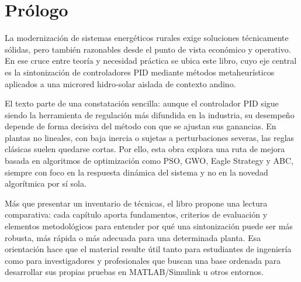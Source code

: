 \chapter*{Prólogo}

La modernización de sistemas energéticos rurales exige soluciones técnicamente sólidas,
pero también razonables desde el punto de vista económico y operativo. En ese cruce
entre teoría y necesidad práctica se ubica este libro, cuyo eje central es la sintonización
de controladores PID mediante métodos metaheurísticos aplicados a una microred
hidro-solar aislada de contexto andino.

El texto parte de una constatación sencilla: aunque el controlador PID sigue siendo la
herramienta de regulación más difundida en la industria, su desempeño depende de forma
decisiva del método con que se ajustan sus ganancias. En plantas no lineales, con baja
inercia o sujetas a perturbaciones severas, las reglas clásicas suelen quedarse cortas.
Por ello, esta obra explora una ruta de mejora basada en algoritmos de optimización como
PSO, GWO, Eagle Strategy y ABC, siempre con foco en la respuesta dinámica del sistema
y no en la novedad algorítmica por sí sola.

Más que presentar un inventario de técnicas, el libro propone una lectura comparativa:
cada capítulo aporta fundamentos, criterios de evaluación y elementos metodológicos para
entender por qué una sintonización puede ser más robusta, más rápida o más adecuada
para una determinada planta. Esa orientación hace que el material resulte útil tanto para
estudiantes de ingeniería como para investigadores y profesionales que buscan una base
ordenada para desarrollar sus propias pruebas en MATLAB/Simulink u otros entornos.
